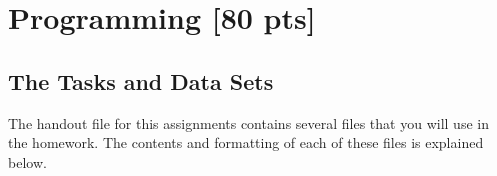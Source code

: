 \documentclass[11pt,addpoints,answers]{exam}
\numberwithin{equation}{section} %
\numberwithin{figure}{section} %
\numberwithin{table}{section} %
\begin{document}
\begin{tcolorbox}[fit,height=10cm, width=17cm, blank, borderline={1pt}{-2pt}]
    \end{tcolorbox}

\clearpage\section{Programming [80 pts]}
\label{programming}

\subsection{The Tasks and Data Sets}\label{dataset}
The handout file for this assignments contains several files that you will use in the homework. The contents and formatting of each of these files is explained below.
\end{document}
